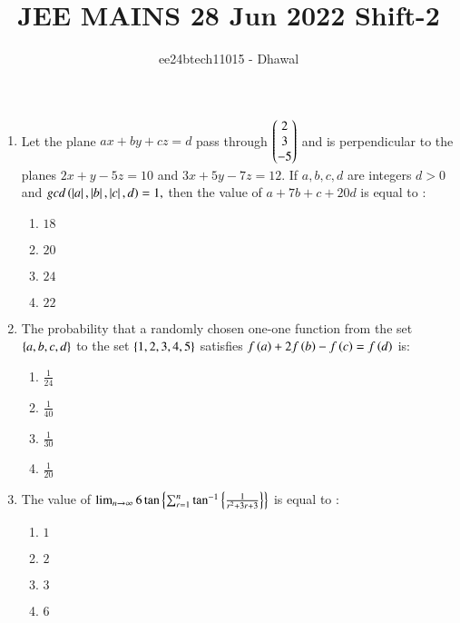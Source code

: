 \documentclass[journal]{IEEEtran}
\theoremstyle{remark}
\begin{document}

\onecolumn

\title{JEE MAINS 28 Jun 2022 Shift-2}
\author{ee24btech11015 - Dhawal}
\maketitle

\renewcommand{\thefigure}{\theenumi}
\renewcommand{\thetable}{\theenumi}

\begin{enumerate}[start=11]
	\item Let the plane $ax + by + cz = d$ pass through $\begin{pmatrix}2\\ 3\\ -5\end{pmatrix}$ and is perpendicular to the planes $2x + y - 5z = 10$ and $3x + 5y - 7z = 12.$ If $a, b, c, d$ are integers $d > 0$ and $gcd \left(\left\vert a\right\vert, \left\vert b\right\vert, \left\vert c\right\vert, d\right) = 1,$ then the value of $a + 7b + c + 20d$ is equal to :\hfill{}

\begin{multicols}{4}
\begin{enumerate}
\item $18$
\item $20$
\item $24$
\item $22$
\end{enumerate}
\end{multicols}

\item  The probability that a randomly chosen one-one function from the set $\left\{a, b, c, d\right\}$ to the set $\left\{1, 2, 3, 4, 5\right\}$ satisfies $f\left(a\right) + 2f\left(b\right) - f\left(c\right) = f\left(d\right)$ is: \hfill{}


\begin{multicols}{4}
\begin{enumerate}
\item $\frac{1}{24}$
\item $\frac{1}{40}$
\item $\frac{1}{30}$
\item $\frac{1}{20}$
\end{enumerate}
\end{multicols}

\item  The value of $ \lim_{n \to \infty} 6 \tan \left\{ \sum_{r=1}^{n} \tan^{-1} \left\{ \frac{1}{r^2 + 3r + 3} \right\}\right\}$
is equal to :\hfill{}

\begin{multicols}{4}
\begin{enumerate}
\item $1$
\item $2$
\item $3$
\item $6$
\end{enumerate}
\end{multicols}


\end{enumerate}
\end{document}
